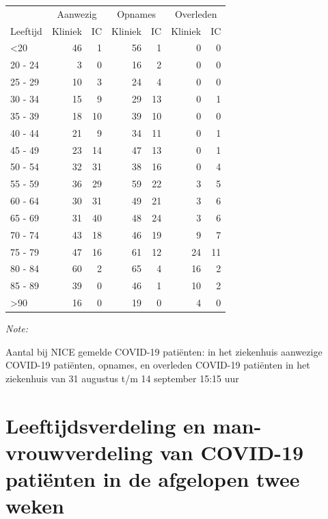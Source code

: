 \documentclass[
  english,
  man,floatsintext]{apa6}
\begin{document}
\begin{table}
\centering\begingroup\fontsize{10}{12}\selectfont

\begin{threeparttable}
\begin{tabular}{lrrrrrr}
\toprule
\multicolumn{1}{c}{ } & \multicolumn{2}{c}{Aanwezig} & \multicolumn{2}{c}{Opnames} & \multicolumn{2}{c}{Overleden} \\
\cmidrule(l{3pt}r{3pt}){2-3} \cmidrule(l{3pt}r{3pt}){4-5} \cmidrule(l{3pt}r{3pt}){6-7}
Leeftijd & Kliniek & IC & Kliniek & IC & Kliniek & IC\\
\midrule
<20 & 46 & 1 & 56 & 1 & 0 & 0\\
20 - 24 & 3 & 0 & 16 & 2 & 0 & 0\\
25 - 29 & 10 & 3 & 24 & 4 & 0 & 0\\
30 - 34 & 15 & 9 & 29 & 13 & 0 & 1\\
35 - 39 & 18 & 10 & 39 & 10 & 0 & 0\\
40 - 44 & 21 & 9 & 34 & 11 & 0 & 1\\
45 - 49 & 23 & 14 & 47 & 13 & 0 & 1\\
50 - 54 & 32 & 31 & 38 & 16 & 0 & 4\\
55 - 59 & 36 & 29 & 59 & 22 & 3 & 5\\
60 - 64 & 30 & 31 & 49 & 21 & 3 & 6\\
65 - 69 & 31 & 40 & 48 & 24 & 3 & 6\\
70 - 74 & 43 & 18 & 46 & 19 & 9 & 7\\
75 - 79 & 47 & 16 & 61 & 12 & 24 & 11\\
80 - 84 & 60 & 2 & 65 & 4 & 16 & 2\\
85 - 89 & 39 & 0 & 46 & 1 & 10 & 2\\
>90 & 16 & 0 & 19 & 0 & 4 & 0\\
\bottomrule
\end{tabular}
\begin{tablenotes}
\item \textit{Note: } 
\item Aantal bij NICE gemelde COVID-19 patiënten: in het ziekenhuis aanwezige COVID-19 patiënten, opnames, en overleden COVID-19 patiënten in het ziekenhuis van 31 augustus t/m 14 september 15:15 uur
\end{tablenotes}
\end{threeparttable}
\endgroup{}
\end{table}

\newpage

\hypertarget{leeftijdsverdeling-en-man-vrouwverdeling-van-covid-19-patiuxebnten-in-de-afgelopen-twee-weken}{%
\section{Leeftijdsverdeling en man-vrouwverdeling van COVID-19 patiënten in de afgelopen twee weken}\label{leeftijdsverdeling-en-man-vrouwverdeling-van-covid-19-patiuxebnten-in-de-afgelopen-twee-weken}}
\end{document}
